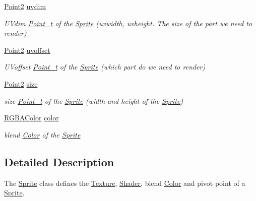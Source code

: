 \begin{DoxyCompactItemize}
\mbox{\label{class_sprite_af01ad3049736a7ff720a86b35c93a6bb}} 
\hyperlink{pointx_8h_aca903a92c8ced8823fea9fac7e23677a}{Point2} \hyperlink{class_sprite_af01ad3049736a7ff720a86b35c93a6bb}{uvdim}
\begin{DoxyCompactList}\small\item\em U\+Vdim \hyperlink{class_point__t}{Point\+\_\+t} of the \hyperlink{class_sprite}{Sprite} (uvwidth, uvheight. The size of the part we need to render) \end{DoxyCompactList}\item 
\mbox{\label{class_sprite_a6d546e83a70f018bb300c3e1d7202252}} 
\hyperlink{pointx_8h_aca903a92c8ced8823fea9fac7e23677a}{Point2} \hyperlink{class_sprite_a6d546e83a70f018bb300c3e1d7202252}{uvoffset}
\begin{DoxyCompactList}\small\item\em U\+Voffset \hyperlink{class_point__t}{Point\+\_\+t} of the \hyperlink{class_sprite}{Sprite} (which part do we need to render) \end{DoxyCompactList}\item 
\mbox{\label{class_sprite_ab1eced6c668a22855d4817fddd6d83b0}} 
\hyperlink{pointx_8h_aca903a92c8ced8823fea9fac7e23677a}{Point2} \hyperlink{class_sprite_ab1eced6c668a22855d4817fddd6d83b0}{size}
\begin{DoxyCompactList}\small\item\em size \hyperlink{class_point__t}{Point\+\_\+t} of the \hyperlink{class_sprite}{Sprite} (width and height of the \hyperlink{class_sprite}{Sprite}) \end{DoxyCompactList}\item 
\mbox{\label{class_sprite_a5604ec44c78749153a4fa6d37cab3af0}} 
\hyperlink{struct_r_g_b_a_color}{R\+G\+B\+A\+Color} \hyperlink{class_sprite_a5604ec44c78749153a4fa6d37cab3af0}{color}
\begin{DoxyCompactList}\small\item\em blend \hyperlink{struct_color}{Color} of the \hyperlink{class_sprite}{Sprite} \end{DoxyCompactList}\end{DoxyCompactItemize}


\subsection{Detailed Description}
The \hyperlink{class_sprite}{Sprite} class defines the \hyperlink{class_texture}{Texture}, \hyperlink{class_shader}{Shader}, blend \hyperlink{struct_color}{Color} and pivot point of a \hyperlink{class_sprite}{Sprite}. 

